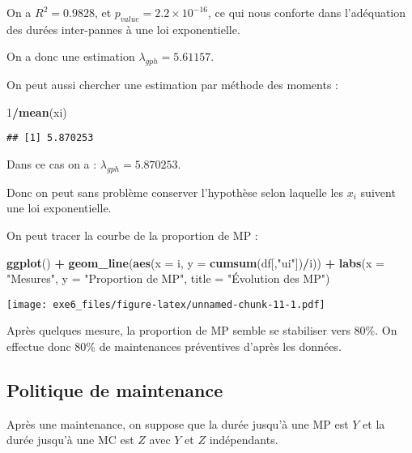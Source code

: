 \documentclass[
]{article}
\newenvironment{Shaded}{\begin{snugshade}}{\end{snugshade}}
\newcommand{\AttributeTok}[1]{\textcolor[rgb]{0.13,0.29,0.53}{#1}}
\newcommand{\DecValTok}[1]{\textcolor[rgb]{0.00,0.00,0.81}{#1}}
\newcommand{\FunctionTok}[1]{\textcolor[rgb]{0.13,0.29,0.53}{\textbf{#1}}}
\newcommand{\NormalTok}[1]{#1}
\newcommand{\SpecialCharTok}[1]{\textcolor[rgb]{0.81,0.36,0.00}{\textbf{#1}}}
\newcommand{\StringTok}[1]{\textcolor[rgb]{0.31,0.60,0.02}{#1}}
\begin{document}
On a \(R^2 = 0.9828\), et \(p_{value}=2.2 \times 10^{-16}\), ce qui nous
conforte dans l'adéquation des durées inter-pannes à une loi
exponentielle.

On a donc une estimation \(\lambda_{gph}=5.61157\).

On peut aussi chercher une estimation par méthode des moments :

\begin{Shaded}
\begin{Highlighting}[]
\DecValTok{1}\SpecialCharTok{/}\FunctionTok{mean}\NormalTok{(xi)}
\end{Highlighting}
\end{Shaded}

\begin{verbatim}
## [1] 5.870253
\end{verbatim}

Dans ce cas on a : \(\lambda_{gph}=5.870253\).

Donc on peut sans problème conserver l'hypothèse selon laquelle les
\(x_i\) suivent une loi exponentielle.

On peut tracer la courbe de la proportion de MP :

\begin{Shaded}
\begin{Highlighting}[]
\FunctionTok{ggplot}\NormalTok{() }\SpecialCharTok{+}
    \FunctionTok{geom\_line}\NormalTok{(}\FunctionTok{aes}\NormalTok{(}\AttributeTok{x =}\NormalTok{ i, }\AttributeTok{y =} \FunctionTok{cumsum}\NormalTok{(df[,}\StringTok{"ui"}\NormalTok{])}\SpecialCharTok{/}\NormalTok{i)) }\SpecialCharTok{+} 
    \FunctionTok{labs}\NormalTok{(}\AttributeTok{x =} \StringTok{"Mesures"}\NormalTok{,}
         \AttributeTok{y =} \StringTok{"Proportion de MP"}\NormalTok{,}
         \AttributeTok{title =} \StringTok{"Évolution des MP"}\NormalTok{)}
\end{Highlighting}
\end{Shaded}

\texttt{[image: exe6\_files/figure-latex/unnamed-chunk-11-1.pdf]}

Après quelques mesure, la proportion de MP semble se stabiliser vers
80\%. On effectue donc 80\% de maintenances préventives d'après les
données.

\subsection{Politique de maintenance}\label{politique-de-maintenance}

Après une maintenance, on suppose que la durée jusqu'à une MP est \(Y\)
et la durée jusqu'à une MC est \(Z\) avec \(Y\) et \(Z\) indépendants.
\end{document}
